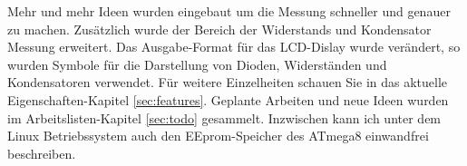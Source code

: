 Mehr und mehr Ideen wurden eingebaut um die Messung schneller und genauer zu machen.
Zus\"atzlich wurde der Bereich der Widerstands und Kondensator Messung erweitert.
Das Ausgabe-Format f\"ur das LCD-Dislay wurde ver\"andert, so wurden Symbole f\"ur die Darstellung von
Dioden, Widerst\"anden und Kondensatoren verwendet.
F\"ur weitere Einzelheiten schauen Sie in das aktuelle Eigenschaften-Kapitel \ref{sec:features}.
Geplante Arbeiten und neue Ideen wurden im Arbeitslisten-Kapitel \ref{sec:todo} gesammelt.
Inzwischen kann ich unter dem Linux Betriebssystem auch den EEprom-Speicher des ATmega8 einwandfrei beschreiben.

